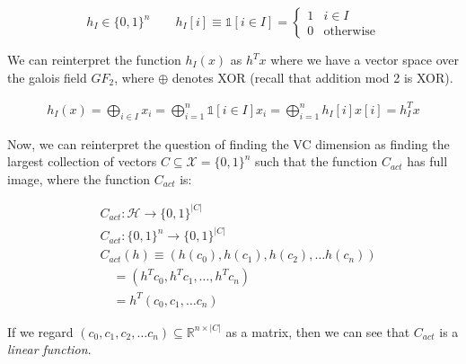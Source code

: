 \documentclass[11pt]{article}
\renewcommand{\H}{\ensuremath{\mathcal{H}}}
\newcommand{\X}{\ensuremath{\mathcal{X}}}
\begin{document}
$$
h_I \in \{0, 1\}^n \qquad
h_I[i] \equiv \mathbb{1}[i \in I] = 
\begin{cases} 1 & i \in I \\ 0 & \text{otherwise} \end{cases}
$$


We can reinterpret the function $h_I(x)$ as $h^T x$ where we have
a vector space over the galois field $GF_2$, where $\oplus$ denotes XOR (recall
that addition mod 2 is XOR).

\begin{align*}
h_I(x) = \bigoplus_{i \in I} x_i = \bigoplus_{i=1}^n \mathbb{1}[i \in I] x_i = \bigoplus_{i=1}^n h_I[i] x[i] =  h_I^T x
\end{align*}


Now, we can reinterpret the question of finding the VC dimension as finding
the largest collection of vectors $C \subseteq \X = \{0, 1\}^n$ such that
the function $C_{act}$ has full image, where the function $C_{act}$ is:

\begin{align*}
&C_{act}: \H \rightarrow \{0, 1\}^{|C|} \\
&C_{act}: \{0, 1\}^n \rightarrow \{0, 1\}^|C| \\
&C_{act}(h) \equiv (h(c_0), h(c_1), h(c_2), \dots h(c_n)) \\
&\quad = (h^T c_0, h^T c_1, \dots, h^T c_n) \\
& \quad = h^T (c_0, c_1, \dots c_n)
\end{align*}

If we regard $(c_0, c_1, c_2, \dots c_n) \subseteq \mathbb R^{n \times |C|}$
as a matrix, then we can see that  $C_{act}$ is a \emph{linear function}.
\end{document}
